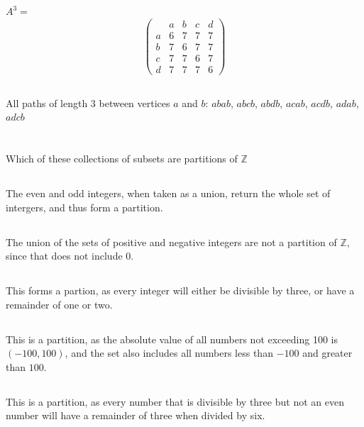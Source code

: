 \documentclass[10pt,reqno,sumlimits]{amsart}
\theoremstyle{plain}
\theoremstyle{definition}
\newcommand{\1}{{\bf 1}}
\numberwithin{equation}{section}
\begin{document}
\subsection{}
$A^3 =$
\[ \left( \begin{array}{ccccc}
\  & a & b & c & d \\
a & 6 & 7 & 7 & 7 \\
b & 7 & 6 & 7 & 7 \\
c & 7 & 7 & 6 & 7 \\
d & 7 & 7 & 7 & 6\end{array} \right) \]
\subsection{}
All paths of length 3 between vertices $a$ and $b$: $abab$, $abcb$, $abdb$, $acab$, $acdb$, $adab$, $adcb$\\


\section{}
Which of these collections of subsets are partitions of $\mathbb{Z}$\\
\subsection{}
The even and odd integers, when taken as a union, return the whole set of intergers, and thus form a partition.
\subsection{}
The union of the sets of positive and negative integers are not a partition of $\mathbb{Z}$, since that does not include $0$.
\subsection{}
This forms a partion, as every integer will either be divisible by three, or have a remainder of one or two.
\subsection{}
This is a partition, as the absolute value of all numbers not exceeding 100 is $(-100, 100)$, and the set also includes all numbers less than $-100$ and greater than $100$.
\subsection{}
This is a partition, as every number that is divisible by three but not an even number will have a remainder of three when divided by six.
\end{document}
